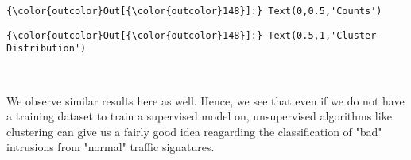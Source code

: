 \documentclass[11pt]{article}
\begin{document}
\begin{Verbatim}[commandchars=\\\{\}]
{\color{outcolor}Out[{\color{outcolor}148}]:} Text(0,0.5,'Counts')
\end{Verbatim}
            
\begin{Verbatim}[commandchars=\\\{\}]
{\color{outcolor}Out[{\color{outcolor}148}]:} Text(0.5,1,'Cluster Distribution')
\end{Verbatim}
            
    \begin{center}
    \end{center}
    { \hspace*{\fill} \\}
    
    We observe similar results here as well. Hence, we see that even if we
do not have a training dataset to train a supervised model on,
unsupervised algorithms like clustering can give us a fairly good idea
reagarding the classification of "bad" intrusions from "normal" traffic
signatures.


    
    
    
    
\end{document}
